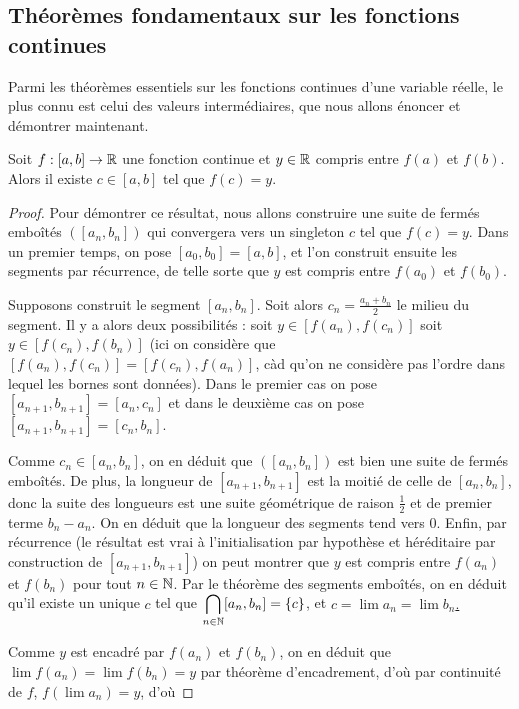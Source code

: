 \subsection{Théorèmes fondamentaux sur les fonctions continues}

Parmi les théorèmes essentiels sur les fonctions continues d'une variable réelle, le plus connu est celui des valeurs intermédiaires, que nous allons énoncer et démontrer maintenant.

\begin{them}
    Soit $f : [a,b] \to \mathbb{R}$ une fonction continue et $y\in\mathbb{R}$ compris entre $f(a)$ et $f(b)$. Alors il existe $c\in[a,b]$ tel que $f(c) = y$.
\end{them}

\begin{proof}
    Pour démontrer ce résultat, nous allons construire une suite de fermés emboîtés $([a_n,b_n])$ qui convergera vers un singleton $c$ tel que $f(c) = y$. Dans un premier temps, on pose $[a_0,b_0] = [a,b]$, et l'on construit ensuite les segments par récurrence, de telle sorte que $y$ est compris entre $f(a_0)$ et $f(b_0)$.

    Supposons construit le segment $[a_n,b_n]$. Soit alors $c_n = \displaystyle{\frac{a_n+b_n}{2}}$ le milieu du segment. Il y a alors deux possibilités : soit $y\in [f(a_n),f(c_n)]$ soit $y\in[f(c_n),f(b_n)]$ (ici on considère que $[f(a_n),f(c_n)] = [f(c_n),f(a_n)]$, càd qu'on ne considère pas l'ordre dans lequel les bornes sont données). Dans le premier cas on pose $[a_{n+1},b_{n+1}] = [a_n,c_n]$ et dans le deuxième cas on pose $[a_{n+1},b_{n+1}] = [c_n,b_n]$.
    
    Comme $c_n\in[a_n,b_n]$, on en déduit que $([a_n,b_n])$ est bien une suite de fermés emboîtés. De plus, la longueur de $[a_{n+1},b_{n+1}]$ est la moitié de celle de $[a_n,b_n]$, donc la suite des longueurs est une suite géométrique de raison $\frac{1}{2}$ et de premier terme $b_n-a_n$. On en déduit que la longueur des segments tend vers $0$. Enfin, par récurrence (le résultat est vrai à l'initialisation par hypothèse et héréditaire par construction de $[a_{n+1},b_{n+1}]$) on peut montrer que $y$ est compris entre $f(a_n)$ et $f(b_n)$ pour tout $n\in\mathbb{N}$. Par le théorème des segments emboîtés, on en déduit qu'il existe un unique $c$ tel que $\displaystyle\bigcap_{n\in\mathbb{N}}[a_n,b_n] = \{c\}$, et \underline{$c = \lim a_n = \lim b_n$.}

    Comme $y$ est encadré par $f(a_n)$ et $f(b_n)$, on en déduit que $\lim f(a_n) = \lim f(b_n) = y$ par théorème d'encadrement, d'où par continuité de $f$, $f(\lim a_n) = y$, d'où 
\end{proof}

